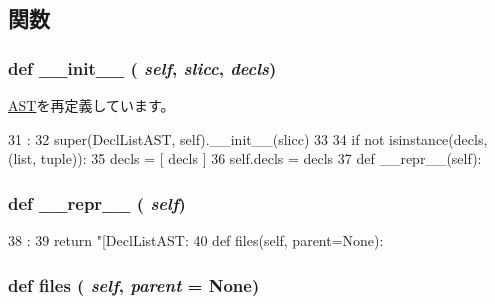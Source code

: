 \subsection{関数}
\hypertarget{classslicc_1_1ast_1_1DeclListAST_1_1DeclListAST_ac775ee34451fdfa742b318538164070e}{
\subsubsection[{\_\-\_\-init\_\-\_\-}]{\setlength{\rightskip}{0pt plus 5cm}def \_\-\_\-init\_\-\_\- ( {\em self}, \/   {\em slicc}, \/   {\em decls})}}
\label{classslicc_1_1ast_1_1DeclListAST_1_1DeclListAST_ac775ee34451fdfa742b318538164070e}


\hyperlink{classslicc_1_1ast_1_1AST_1_1AST_ac775ee34451fdfa742b318538164070e}{AST}を再定義しています。


\begin{DoxyCode}
31                                     :
32         super(DeclListAST, self).__init__(slicc)
33 
34         if not isinstance(decls, (list, tuple)):
35             decls = [ decls ]
36         self.decls = decls
37 
    def __repr__(self):
\end{DoxyCode}
\hypertarget{classslicc_1_1ast_1_1DeclListAST_1_1DeclListAST_ad8b9328939df072e4740cd9a63189744}{
\subsubsection[{\_\-\_\-repr\_\-\_\-}]{\setlength{\rightskip}{0pt plus 5cm}def \_\-\_\-repr\_\-\_\- ( {\em self})}}
\label{classslicc_1_1ast_1_1DeclListAST_1_1DeclListAST_ad8b9328939df072e4740cd9a63189744}



\begin{DoxyCode}
38                       :
39         return "[DeclListAST: %
40 
    def files(self, parent=None):
\end{DoxyCode}
\hypertarget{classslicc_1_1ast_1_1DeclListAST_1_1DeclListAST_a35b1a87f6fcbddeb5b793b0e415765f8}{
\subsubsection[{files}]{\setlength{\rightskip}{0pt plus 5cm}def files ( {\em self}, \/   {\em parent} = {\ttfamily None})}}
\label{classslicc_1_1ast_1_1DeclListAST_1_1DeclListAST_a35b1a87f6fcbddeb5b793b0e415765f8}



